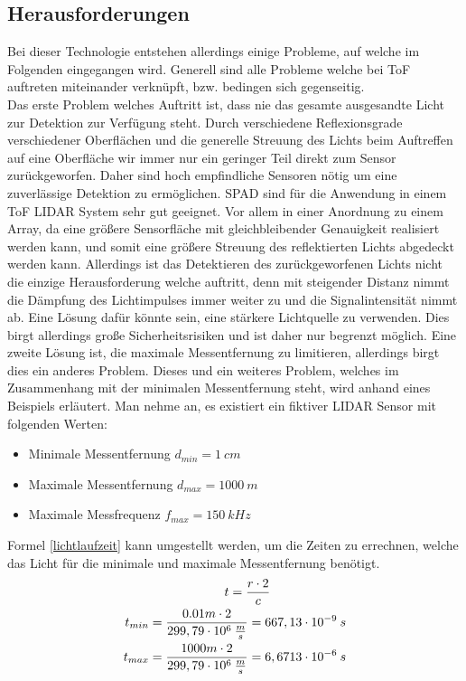 \subsection{Herausforderungen}\label{subsec:tof_herausvorderungen}
Bei dieser Technologie entstehen allerdings einige Probleme, auf welche im Folgenden eingegangen wird. Generell sind alle Probleme welche bei \ac{ToF} auftreten miteinander verknüpft, bzw. bedingen sich gegenseitig. \\
Das erste Problem welches Auftritt ist, dass nie das gesamte ausgesandte Licht zur Detektion zur Verfügung steht. Durch verschiedene Reflexionsgrade verschiedener Oberflächen und die generelle Streuung des Lichts beim Auftreffen auf eine Oberfläche wir immer nur ein geringer Teil direkt zum Sensor zurückgeworfen. Daher sind hoch empfindliche Sensoren nötig um eine zuverlässige Detektion zu ermöglichen.
\ac{SPAD} sind für die Anwendung in einem \ac{ToF} \ac{LIDAR} System sehr gut geeignet. Vor allem in einer Anordnung zu einem Array, da eine größere Sensorfläche mit gleichbleibender Genauigkeit realisiert werden kann, und somit eine größere Streuung des reflektierten Lichts abgedeckt werden kann. Allerdings ist das Detektieren des zurückgeworfenen Lichts nicht die einzige Herausforderung welche auftritt, denn mit steigender Distanz nimmt die Dämpfung des Lichtimpulses immer weiter zu und die Signalintensität nimmt ab. 
Eine Lösung dafür könnte sein, eine stärkere Lichtquelle zu verwenden. Dies birgt allerdings große Sicherheitsrisiken und ist daher nur begrenzt möglich. Eine zweite Lösung ist, die maximale Messentfernung zu limitieren, allerdings birgt dies ein anderes Problem. Dieses und ein weiteres Problem, welches im Zusammenhang mit der minimalen Messentfernung steht, wird anhand eines Beispiels erläutert.
\newpage
Man nehme an, es existiert ein fiktiver \ac{LIDAR} Sensor mit folgenden Werten:
\begin{itemize}
	\item Minimale Messentfernung $d_{min}=1\:cm$
	\item Maximale Messentfernung $d_{max}=1000\: m$
	\item Maximale Messfrequenz $f_{max}=150\: kHz$ 
\end{itemize}
Formel \ref{lichtlaufzeit} kann umgestellt werden, um die Zeiten zu errechnen, welche das Licht für die minimale und maximale Messentfernung benötigt. 
\begin{equation}\formelentry{Berechnung der minimalen und maximalen Zeit}
	\begin{split}
		t = \frac{r \cdot 2}{c} \qquad\qquad\qquad\\
		t_{min} = \frac{0.01 m \cdot 2}{299,79 \cdot 10^6\: \frac{m}{s}} = 667,13 \cdot 10^{-9}\:s\\
		t_{max} = \frac{1000 m \cdot 2}{299,79 \cdot 10^6\: \frac{m}{s}} = 6,6713 \cdot 10^{-6}\:s\\
	\end{split}
\end{equation} 
